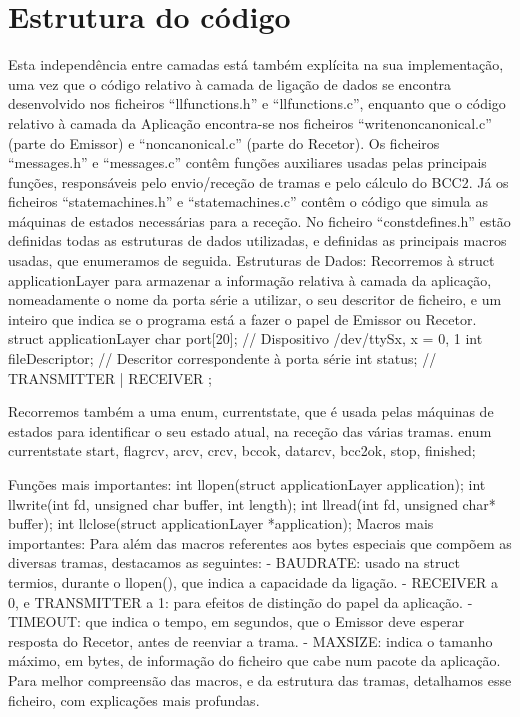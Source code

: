 \documentclass[article, a4paper, 11pt, oneside]{memoir}
\begin{document}
\newpage
\chapter[Estrutura do código][Estrutura do código]{Estrutura do código} \label{\thechapter}

Esta independência entre camadas está também explícita na sua implementação, uma vez que o código relativo à camada de ligação de dados se encontra desenvolvido nos ficheiros “llfunctions.h” e “llfunctions.c”, enquanto que o código relativo à camada da Aplicação encontra-se nos ficheiros “writenoncanonical.c” (parte do Emissor) e “noncanonical.c” (parte do Recetor). Os ficheiros “messages.h” e “messages.c” contêm funções auxiliares usadas pelas principais funções, responsáveis pelo envio/receção de tramas e pelo cálculo do BCC2. Já os ficheiros “statemachines.h” e “statemachines.c” contêm o código que simula as máquinas de estados necessárias para a receção.
No ficheiro “constdefines.h” estão definidas todas as estruturas de dados utilizadas, e definidas as principais macros usadas, que enumeramos de seguida.
Estruturas de Dados:
Recorremos à struct applicationLayer para armazenar a informação relativa à camada da aplicação, nomeadamente o nome da porta série a utilizar, o seu descritor de ficheiro, e um inteiro que indica se o programa está a fazer o papel de Emissor ou Recetor.
struct applicationLayer {
 	char port[20]; // Dispositivo /dev/ttySx, x = 0, 1
 	int fileDescriptor; // Descritor correspondente à porta série
 int status; // TRANSMITTER | RECEIVER
 };

Recorremos também a uma enum, currentstate, que é usada pelas máquinas de estados para identificar o seu estado atual, na receção das várias tramas.
enum currentstate {start, flagrcv, arcv, crcv, bccok, datarcv, bcc2ok, stop, finished};

Funções mais importantes:
int llopen(struct applicationLayer application);
int llwrite(int fd, unsigned char buffer, int length);
int llread(int fd, unsigned char* buffer);
int llclose(struct applicationLayer *application);
Macros mais importantes:
Para além das macros referentes aos bytes especiais que compõem as diversas tramas, destacamos as seguintes:
 - BAUDRATE: usado na struct termios, durante o llopen(), que indica a capacidade da ligação.
- RECEIVER a 0, e TRANSMITTER a 1: para efeitos de distinção do papel da aplicação.
- TIMEOUT: que indica o tempo, em segundos, que o Emissor deve esperar resposta do Recetor, antes de reenviar a trama.
- MAXSIZE: indica o tamanho máximo, em bytes, de informação do ficheiro que cabe num pacote da aplicação.
Para melhor compreensão das macros, e da estrutura das tramas, detalhamos esse ficheiro, com explicações mais profundas.
\end{document}
